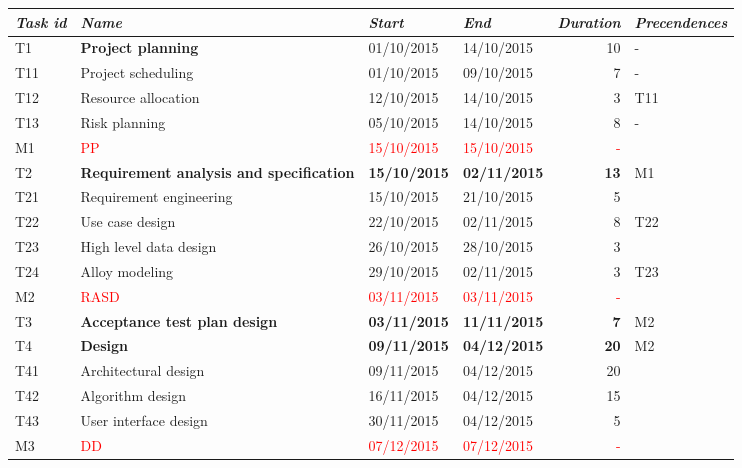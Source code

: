 \noindent \begin{center}
\begin{tabular}{l|>{\raggedright}p{4cm}|l|l|r|l}
\hline 
\emph{Task id} & \emph{Name} & \emph{Start} & \emph{End} & \emph{Duration} & \emph{Precendences}\tabularnewline
\hline 
\hline 
T1 & \textbf{Project planning} & 01/10/2015 & 14/10/2015 & 10 & -\tabularnewline
\hline 
T11 & {\footnotesize{}Project scheduling} & {\footnotesize{}01/10/2015} & {\footnotesize{}09/10/2015} & {\footnotesize{}7} & -\tabularnewline
\hline 
T12 & {\footnotesize{}Resource allocation} & {\footnotesize{}12/10/2015} & {\footnotesize{}14/10/2015} & {\footnotesize{}3} & T11\tabularnewline
\hline 
T13 & {\footnotesize{}Risk planning} & {\footnotesize{}05/10/2015} & {\footnotesize{}14/10/2015} & {\footnotesize{}8} & -\tabularnewline
\hline 
M1 & \textcolor{red}{PP} & \textcolor{red}{15/10/2015} & \textcolor{red}{15/10/2015} & \textcolor{red}{-} & \tabularnewline
\hline 
T2 & \textbf{Requirement analysis and specification} & \textbf{15/10/2015} & \textbf{02/11/2015} & \textbf{13} & M1\tabularnewline
\hline 
T21 & {\footnotesize{}Requirement engineering} & {\footnotesize{}15/10/2015} & {\footnotesize{}21/10/2015} & {\footnotesize{}5} & \tabularnewline
\hline 
T22 & {\footnotesize{}Use case design} & {\footnotesize{}22/10/2015} & {\footnotesize{}02/11/2015} & {\footnotesize{}8} & T22\tabularnewline
\hline 
T23 & {\footnotesize{}High level data design} & {\footnotesize{}26/10/2015} & {\footnotesize{}28/10/2015} & {\footnotesize{}3} & \tabularnewline
\hline 
T24 & {\footnotesize{}Alloy modeling} & {\footnotesize{}29/10/2015} & {\footnotesize{}02/11/2015} & {\footnotesize{}3} & T23\tabularnewline
\hline 
M2 & \textcolor{red}{RASD} & \textcolor{red}{03/11/2015} & \textcolor{red}{03/11/2015} & \textcolor{red}{-} & \tabularnewline
\hline 
T3 & \textbf{Acceptance test plan design} & \textbf{03/11/2015} & \textbf{11/11/2015} & \textbf{7} & M2\tabularnewline
\hline 
T4 & \textbf{Design} & \textbf{09/11/2015} & \textbf{04/12/2015} & \textbf{20} & M2\tabularnewline
\hline 
T41 & {\footnotesize{}Architectural design} & {\footnotesize{}09/11/2015} & {\footnotesize{}04/12/2015} & {\footnotesize{}20} & \tabularnewline
\hline 
T42 & {\footnotesize{}Algorithm design} & {\footnotesize{}16/11/2015} & {\footnotesize{}04/12/2015} & {\footnotesize{}15} & \tabularnewline
\hline 
T43 & {\footnotesize{}User interface design} & {\footnotesize{}30/11/2015} & {\footnotesize{}04/12/2015} & {\footnotesize{}5} & \tabularnewline
\hline 
M3 & \textcolor{red}{DD} & \textcolor{red}{07/12/2015} & \textcolor{red}{07/12/2015} & \textcolor{red}{-} & \tabularnewline

\end{tabular}
\end{center}

